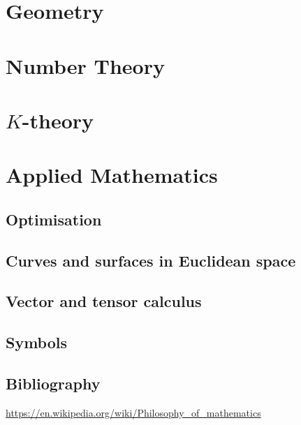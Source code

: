 \documentclass{report}
\begin{document}
\part{Geometry}
\setcounter{chapter}{0} %


\part{Number Theory}
\setcounter{chapter}{0} %


\part{$K$-theory}
\setcounter{chapter}{0} %



\part{Applied Mathematics}
\setcounter{chapter}{0} %
\chapter{Optimisation}


\chapter{Curves and surfaces in Euclidean space}

\chapter{Vector and tensor calculus}





\appendix

\chapter{Symbols}


\listoftheorems[title={List of named results}, swapnumber,ignoreall,onlynamed]



\chapter{Bibliography}

\url{https://en.wikipedia.org/wiki/Philosophy_of_mathematics}
\end{document}
